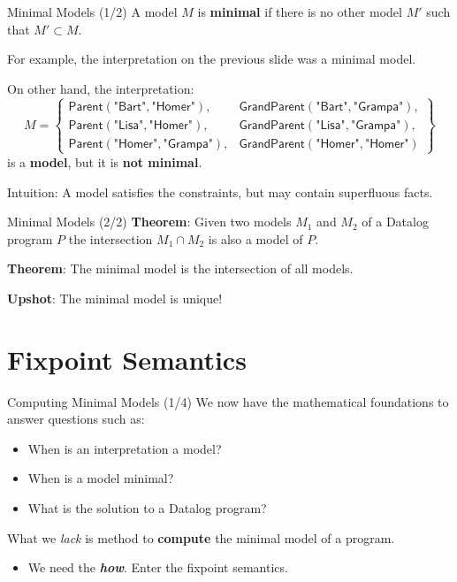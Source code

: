 \begin{frame}{Minimal Models (1/2)}
A model $M$ is \textbf{minimal} if there is no other model $M'$ such that $M'
\subset M$.

For example, the interpretation on the previous slide was a minimal model.

On other hand, the interpretation:
$$
M = \left\{
\begin{array}{ll}
\textsf{Parent}(\textsf{"Bart"}, \textsf{"Homer"}),     & \textsf{GrandParent}(\textsf{"Bart"}, \textsf{"Grampa"}), \\
\textsf{Parent}(\textsf{"Lisa"}, \textsf{"Homer"}),     & \textsf{GrandParent}(\textsf{"Lisa"}, \textsf{"Grampa"}), \\
\textsf{Parent}(\textsf{"Homer"}, \textsf{"Grampa"}),   & \textsf{GrandParent}(\textsf{"Homer"}, \textsf{"Homer"})
\end{array}\right\}
$$
is a \textbf{model}, but it is \textbf{not minimal}.

Intuition: A model satisfies the constraints, but may contain superfluous facts.
\end{frame}

\begin{frame}{Minimal Models (2/2)}
\textbf{Theorem}: Given two models $M_1$ and $M_2$ of a Datalog program $P$ the
intersection $M_1 \cap M_2$ is also a model of $P$. 

\textbf{Theorem}: The minimal model is the intersection of all models.

\textbf{Upshot}: The minimal model is unique!
\end{frame}

\section{Fixpoint Semantics}

\begin{frame}{Computing Minimal Models (1/4)}
We now have the mathematical foundations to answer questions such as:
\begin{itemize}
\item When is an interpretation a model?
\item When is a model minimal?
\item What is the solution to a Datalog program?
\end{itemize}

What we \emph{lack} is method to \textbf{compute} the minimal model of a program.
\begin{itemize}
    \item We need the \textbf{\emph{how}}. Enter the fixpoint semantics.
\end{itemize}
\end{frame}

